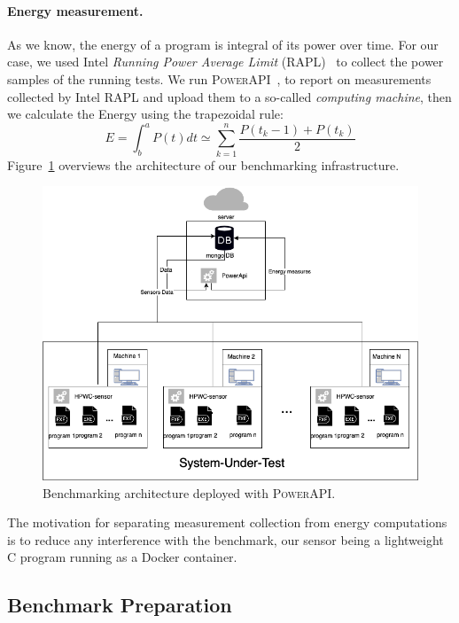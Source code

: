\paragraph{Energy measurement.}
As we know, the energy of a program is integral of its power over time.
For our case, we used Intel \emph{Running Power Average Limit} (RAPL)~\cite{Khan:2018:RAE:3199681.3177754} to collect the power samples of the running tests.
We run \textsc{PowerAPI}~\cite{DBLP:journals/jss/ColmantRKSFS18}, to report on measurements collected by Intel RAPL and upload them to a so-called \emph{computing machine}, then we calculate the Energy using the trapezoidal rule:
\begin{equation}
      E = \int^a_b P(t)dt \simeq \sum^n_{k=1} \frac{P(t_k-1)+P(t_k)}{2}
\end{equation}
Figure~\ref{fig:powerapi} overviews the architecture of our benchmarking infrastructure.

\begin{figure}[hbt]
      \includegraphics[width=.9\linewidth]{imgs/SmartWatts.png}
      \caption{Benchmarking architecture deployed with \textsc{PowerAPI}.}
      \label{fig:powerapi}
\end{figure}

The motivation for separating measurement collection from energy computations is to reduce any interference with the benchmark, our sensor being a lightweight C program running as a Docker container.

\subsection{Benchmark Preparation}
